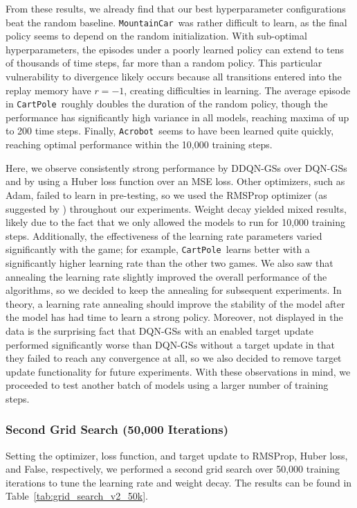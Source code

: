 \documentclass[11pt]{article}
\newcommand{\cp}{\texttt{CartPole}}
\newcommand{\ab}{\texttt{Acrobot}}
\newcommand{\mc}{\texttt{MountainCar}}
\begin{document}
From these results, we already find that our best hyperparameter configurations beat the random baseline. \mc~was rather difficult to learn, as the final policy seems to depend on the random initialization. With sub-optimal hyperparameters, the episodes under a poorly learned policy can extend to tens of thousands of time steps, far more than a random policy. This particular vulnerability to divergence likely occurs because all transitions entered into the replay memory have $r = -1$, creating difficulties in learning. The average episode in \cp~roughly doubles the duration of the random policy, though the performance has significantly high variance in all models, reaching maxima of up to 200 time steps. Finally, \ab~seems to have been learned quite quickly, reaching optimal performance within the 10,000 training steps.

Here, we observe consistently strong performance by DDQN-GSs over DQN-GSs and by using a Huber loss function over an MSE loss. Other optimizers, such as Adam, failed to learn in pre-testing, so we used the RMSProp optimizer (as suggested by \cite{mnih2013playing}) throughout our experiments. Weight decay yielded mixed results, likely due to the fact that we only allowed the models to run for 10,000 training steps. Additionally, the effectiveness of the learning rate parameters varied significantly with the game; for example, \cp~learns better with a significantly higher learning rate than the other two games. We also saw that annealing the learning rate slightly improved the overall performance of the algorithms, so we decided to keep the annealing for subsequent experiments. In theory, a learning rate annealing should improve the stability of the model after the model has had time to learn a strong policy. Moreover, not displayed in the data is the surprising fact that DQN-GSs with an enabled target update performed significantly worse than DQN-GSs without a target update in that they failed to reach any convergence at all, so we also decided to remove target update functionality for future experiments. With these observations in mind, we proceeded to test another batch of models using a larger number of training steps. 

\subsubsection{Second Grid Search (50,000 Iterations)}
 
Setting the optimizer, loss function, and target update to RMSProp, Huber loss, and False, respectively, we performed a second grid search over 50,000 training iterations to tune the learning rate and weight decay. The results can be found in Table~\ref{tab:grid_search_v2_50k}.
\end{document}

